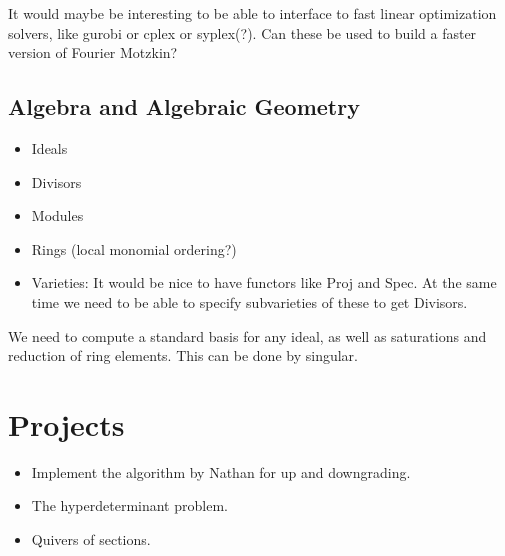 \documentclass[a4paper]{article}
\begin{document}
It would maybe be interesting to be able to interface to fast linear optimization solvers, like gurobi or cplex or syplex(?). Can these be used to build a faster version of Fourier Motzkin?
\subsection{Algebra and Algebraic Geometry}
\begin{itemize}
   \item[] Ideals
	\item[] Divisors
	\item[] Modules
	\item[] Rings (local monomial ordering?)
	\item[] Varieties: It would be nice to have functors like Proj and Spec. At the same time we need to be able to specify subvarieties of these to get Divisors.
\end{itemize}
We need to compute a standard basis for any ideal, as well as saturations and reduction of ring elements.
This can be done by singular.
\section{Projects}
\begin{itemize}
\item Implement the algorithm by Nathan for up and downgrading.
\item The hyperdeterminant problem.
\item Quivers of sections.
\end{itemize}
\end{document}
